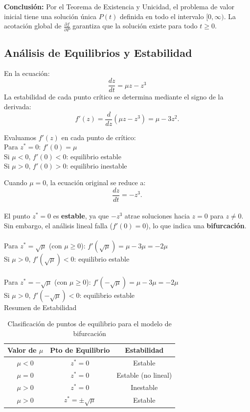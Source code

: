 \documentclass[a4paper,10pt,twocolumn]{article}
\begin{document}
\textbf{Conclusión:} Por el Teorema de Existencia y Unicidad, el problema de valor inicial tiene una solución única $P(t)$ definida en todo el intervalo $[0, \infty)$. La acotación global de $\frac{\partial f}{\partial P}$ garantiza que la solución existe para todo $t \geq 0$.

\subsection{Análisis de Equilibrios y Estabilidad}\label{subsec:equilibrios}


En la  ecuación: \[\frac{dz}{dt} = \mu z - z^3\]
La estabilidad de cada punto crítico se determina mediante el signo de la derivada:
\[f'(z) = \frac{d}{dz}(\mu z - z^3) = \mu - 3z^2.\]

Evaluamos \(f'(z)\) en cada punto de crítico:
\\Para \(z^* = 0\): \(f'(0) = \mu\)
\\Si \(\mu < 0\), \(f'(0) < 0\): equilibrio estable
\\Si \(\mu > 0\), \(f'(0) > 0\): equilibrio inestable

Cuando $\mu = 0$, la ecuación original se reduce a:
\[\frac{dz}{dt} = -z^3.\]
\\El punto $z^* = 0$ es \textbf{estable}, ya que $-z^3$ atrae soluciones hacia $z = 0$ para $z \neq 0$. 
\\Sin embargo, el análisis lineal falla ($f'(0) = 0$), lo que indica una \textbf{bifurcación}.
\\
\\Para \(z^* = \sqrt{\mu}\) (con \(\mu \geq 0\)): \(f'(\sqrt{\mu}) = \mu - 3\mu = -2\mu\)
\\Si \(\mu > 0\), \(f'(\sqrt{\mu}) < 0\): equilibrio estable
\\
\\Para \(z^* = -\sqrt{\mu}\) (con \(\mu \geq 0\)): \(f'(-\sqrt{\mu}) = \mu - 3\mu = -2\mu\)
\\Si \(\mu > 0\), \(f'(-\sqrt{\mu}) < 0\): equilibrio estable
\\
{Resumen de Estabilidad}
\begin{table}[H]
  \begin{tabular}{|c|c|c|}
      \hline
      \textbf{Valor de $\mu$} & \textbf{Pto de Equilibrio} & \textbf{Estabilidad} \\
      \hline
      $\mu < 0$ & $z^* = 0$ & Estable \\
      \hline
      $\mu = 0$ & $z^* = 0$ & Estable (no lineal) \\
      \hline
      $\mu > 0$ & $z^* = 0$ & Inestable \\
      \hline
      $\mu > 0$ & $z^* = \pm\sqrt{\mu}$ & Estable \\
      \hline
  \end{tabular}
  \caption{Clasificación de puntos de equilibrio para el modelo de bifurcación}
  \label{tab:estabilidad-bifurcacion}
\end{table}
\end{document}
